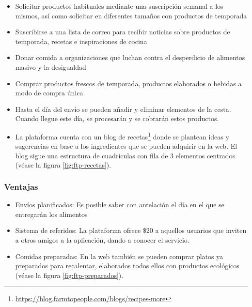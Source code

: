 \begin{itemize}

	\item Solicitar productos habituales mediante una suscripción semanal a los mismos, así como solicitar  en diferentes tamaños con productos de temporada

	\item Suscribirse a una lista de correo para recibir noticias sobre productos de temporada, recetas e inspiraciones de cocina

	\item Donar comida a organizaciones que luchan contra el desperdicio de alimentos masivo y la desigualdad

	\item Comprar productos frescos de temporada, productos elaborados o bebidas a modo de compra única

	\item Hasta el día del envío se pueden añadir y eliminar elementos de la cesta. Cuando llegue este día, se procesarán y se cobrarán estos productos.

	\item La plataforma cuenta con un blog de recetas\footnote{\url{https://blog.farmtopeople.com/blogs/recipes-more}} donde se plantean ideas y sugerencias en base a los ingredientes que se pueden adquirir en la web. El blog sigue una estructura de cuadrículas con fila de 3 elementos centrados (véase la figura \ref{fig:ftp-recetas}).

\end{itemize}


\subsubsection{Ventajas}

\begin{itemize}

	\item Envíos planificados: Es posible saber con antelación el día en el que se entregarán los alimentos

	\item Sistema de referidos: La plataforma ofrece \$20 a aquellos usuarios que inviten a otros amigos a la aplicación, dando a conocer el servicio.

	\item Comidas preparadas: En la web también se pueden comprar platos ya preparados para recalentar, elaborados todos ellos con productos ecológicos (véase la figura \ref{fig:ftp-preparados}).

\end{itemize}

